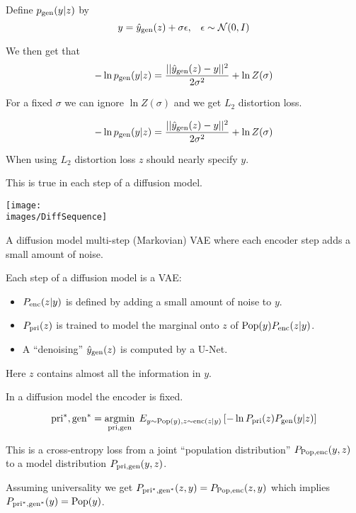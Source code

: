 {Define $p_{\mathrm{gen}}(y|z)$ by
$$y = \hat{y}_{\mathrm{gen}}(z) + \sigma\epsilon,\;\;\;\epsilon \sim {\cal N}(0,I)$$

\vfill
We then get that
$$- \ln p_{\mathrm{gen}}(y|z) = \frac{||\hat{y}_{\mathrm{gen}}(z) - y||^2}{2\sigma^2} + \ln Z(\sigma)$$

\vfill
For a fixed $\sigma$ we can ignore $\ln Z(\sigma)$ and we get $L_2$ distortion loss.


$$- \ln p_{\mathrm{gen}}(y|z) = \frac{||\hat{y}_{\mathrm{gen}}(z) - y||^2}{2\sigma^2} + \ln Z(\sigma)$$

\vfill
When using $L_2$ distortion loss $z$ should nearly specify $y$.

\vfill
This is true in each step of a diffusion model.


\centerline{\texttt{[image: \\images/DiffSequence]}}


\vfill
A diffusion model multi-step (Markovian) VAE where each encoder step adds a small amount of noise.


Each step of a diffusion model is a VAE:

\vfill
\begin{itemize}
\item $P_{\mathrm{enc}}(z|y)$ is defined by adding a small amount of noise to $y$.

\vfill
\item $P_{\mathrm{pri}}(z)$ is trained to model the marginal onto $z$ of $\mathrm{Pop}(y)P_{\mathrm{enc}}(z|y)$.

\vfill
\item A ``denoising'' $\hat{y}_{\mathrm{gen}}(z)$ is computed by a U-Net.
\end{itemize}

\vfill
Here $z$ contains almost all the information in $y$.

In a diffusion model the encoder is fixed.

$$\mathrm{pri}^*,\mathrm{gen}^* = \operatorname*{argmin}_{\mathrm{pri},\mathrm{gen}}\;E_{y \sim \mathrm{Pop}(y),z \sim \mathrm{enc}(z|y)}\left[-\ln P_{\mathrm{pri}}(z)P_{\mathrm{gen}}(y|z)\right]$$

\vfill
This is a cross-entropy loss from a joint ``population distribution'' $P_{\mathrm{Pop},\mathrm{enc}}(y,z)$ to a model
distribution $P_{\mathrm{pri},\mathrm{gen}}(y,z)$.

\vfill
Assuming universality we get $P_{\mathrm{pri}^*,\mathrm{gen}^*}(z,y) = P_{\mathrm{Pop},\mathrm{enc}}(z,y)$ which implies {\color{red} $P_{\mathrm{pri}^*,\mathrm{gen}^*}(y) = \mathrm{Pop}(y)$}.

}
